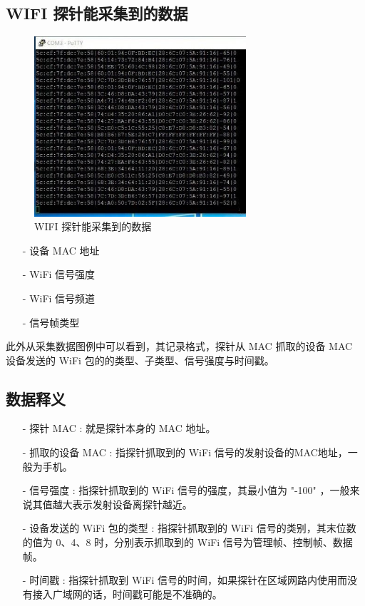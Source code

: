 \subsection{WIFI 探针能采集到的数据}

\begin{figure}[htb]
\centering 
\includegraphics[width=0.70\textwidth]{img/ch1s5m6.jpg} 
\caption{WIFI 探针能采集到的数据}
\label{Test}
\end{figure}

\begin{itemize}
\item [-] 设备 MAC 地址
\item [-] WiFi 信号强度
\item [-] WiFi 信号频道
\item [-] 信号帧类型
\end{itemize}

此外从采集数据图例中可以看到，其记录格式，探针从 MAC 抓取的设备 MAC 设备发送的 WiFi 包的的类型、子类型、信号强度与时间戳。

\subsection{数据释义}

\begin{itemize}
\item [-] 探针 MAC : 就是探针本身的 MAC 地址。
\item [-] 抓取的设备 MAC : 指探针抓取到的 WiFi 信号的发射设备的MAC地址，一般为手机。
\item [-] 信号强度 : 指探针抓取到的 WiFi 信号的强度，其最小值为 "-100" ，一般来说其值越大表示发射设备离探针越近。
\item [-] 设备发送的 WiFi 包的类型 : 指探针抓取到的 WiFi 信号的类别，其末位数的值为 0、4、8 时，分别表示抓取到的 WiFi 信号为管理帧、控制帧、数据帧。
\item [-] 时间戳 : 指探针抓取到 WiFi 信号的时间，如果探针在区域网路内使用而没有接入广域网的话，时间戳可能是不准确的。
\end{itemize}

